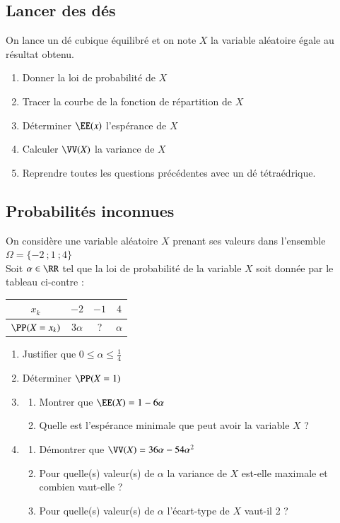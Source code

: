 \documentclass[oneside,12pt]{article}          %
\begin{document}
\subsection{Lancer des dés}
On lance un dé cubique équilibré et on note $X$ la variable aléatoire égale au résultat obtenu.
\begin{enumerate}
    \item Donner la loi de probabilité de $X$
    \item Tracer la courbe de la fonction de répartition de $X$
    \item Déterminer $\EE(x)$ l'espérance de $X$
    \item Calculer $\VV(X)$ la variance de $X$
    \item Reprendre toutes les questions précédentes avec un dé tétraédrique.
\end{enumerate}



\subsection{Probabilités inconnues}
On considère une variable aléatoire $X$ prenant ses valeurs dans l'ensemble $\Omega=\{-2~;1~;4\}$ \\
Soit $\alpha\in\RR$ tel que la loi de probabilité de la variable $X$ soit donnée par le tableau ci-contre :

\begin{center}
    \renewcommand{\arraystretch}{1.5}
    \setlength{\tabcolsep}{15pt}
    \begin{tabular}{|c|c|c|c|} \hline
    $x_k$ & $-2$ & $-1$ & $4$ \\ \hline
    $\PP(X=x_k)$ & $3\alpha$ & ? & $\alpha$ \\ \hline
    \end{tabular}
\end{center}
\begin{enumerate}
    \item Justifier que $0\leq\alpha\leq\frac{1}{4}$
    \item Déterminer $\PP(X=1)$
    \item \begin{enumerate}
        \item Montrer que $\EE(X)=1-6\alpha$
        \item Quelle est l'espérance minimale que peut avoir la variable $X$ ?
    \end{enumerate}
    \item \begin{enumerate}
        \item Démontrer que $\VV(X)=36\alpha-54\alpha^2$
        \item Pour quelle(s) valeur(s) de $\alpha$ la variance de $X$ est-elle maximale et combien vaut-elle ?
        \item Pour quelle(s) valeur(s) de $\alpha$ l'écart-type de $X$ vaut-il 2 ?
    \end{enumerate}
\end{enumerate}
\end{document}
